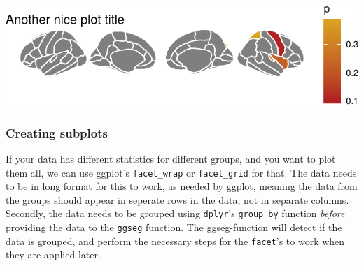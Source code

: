\documentclass[fleqn,10pt]{wlpeerj} %
\newenvironment{Shaded}{\begin{snugshade}}{\end{snugshade}}
\newcommand{\DataTypeTok}[1]{\textcolor[rgb]{0.13,0.29,0.53}{#1}}
\newcommand{\DecValTok}[1]{\textcolor[rgb]{0.00,0.00,0.81}{#1}}
\newcommand{\KeywordTok}[1]{\textcolor[rgb]{0.13,0.29,0.53}{\textbf{#1}}}
\newcommand{\NormalTok}[1]{#1}
\newcommand{\OperatorTok}[1]{\textcolor[rgb]{0.81,0.36,0.00}{\textbf{#1}}}
\newcommand{\OtherTok}[1]{\textcolor[rgb]{0.56,0.35,0.01}{#1}}
\newcommand{\StringTok}[1]{\textcolor[rgb]{0.31,0.60,0.02}{#1}}
\begin{document}
\includegraphics{draft_1_files/figure-latex/datasuppX-1.pdf}

\hypertarget{creating-subplots}{%
\subsubsection{Creating subplots}\label{creating-subplots}}

If your data has different statistics for different groups, and you want to plot them all, we can use ggplot's \texttt{facet\_wrap} or \texttt{facet\_grid} for that.
The data needs to be in long format for this to work, as needed by ggplot, meaning the data from the groups should appear in seperate rows in the data, not in separate columns. Secondly, the data needs to be grouped using \texttt{dplyr}'s \texttt{group\_by} function \emph{before} providing the data to the \texttt{ggseg} function.
The ggseg-function will detect if the data is grouped, and perform the necessary steps for the \texttt{facet}'s to work when they are applied later.

\begin{Shaded}
\end{Shaded}
\end{document}
